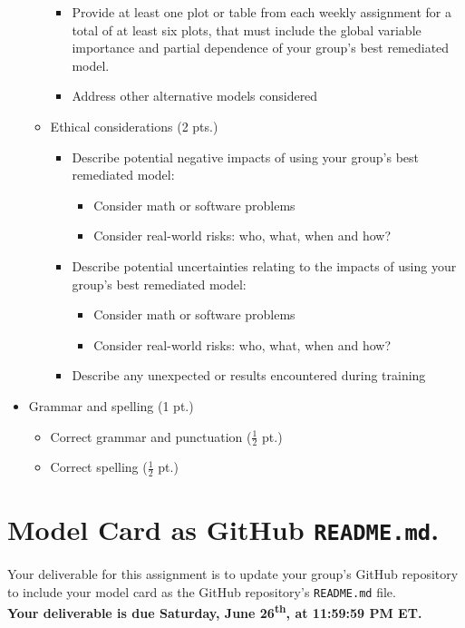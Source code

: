\documentclass[fleqn]{article}
\begin{document}
\begin{itemize}
\begin{itemize}
\begin{itemize}
			\item Provide at least one plot or table from each weekly assignment for a total of at least six plots, that must include the global variable importance and partial dependence of your group's best remediated model.
			\item Address other alternative models considered
		\end{itemize}
		\item Ethical considerations (2 pts.)
		\begin{itemize}
			\item Describe potential negative impacts of using your group's best remediated model: 
			\begin{itemize}
			\item Consider math or software problems
			\item Consider real-world risks: who, what, when and how?
			\end{itemize}
			\item Describe potential uncertainties relating to the impacts of using your group's best remediated model:
			\begin{itemize} 
				\item Consider math or software problems
				\item Consider real-world risks: who, what, when and how?
			\end{itemize}
			\item Describe any unexpected or results encountered during training
		\end{itemize}
	\end{itemize}
	\item Grammar and spelling (1 pt.)
	\begin{itemize} 
		\item Correct grammar and punctuation ($\frac{1}{2}$ pt.)
		\item Correct spelling ($\frac{1}{2}$ pt.)
	\end{itemize}
\end{itemize}


\section{Model Card as GitHub \texttt{README.md}.}

Your deliverable for this assignment is to update your group's GitHub repository to include your model card as the GitHub repository's \texttt{README.md} file.\\

\noindent \textbf{Your deliverable is due Saturday, June 26\textsuperscript{th}, at 11:59:59 PM ET.}\\
\end{document}
